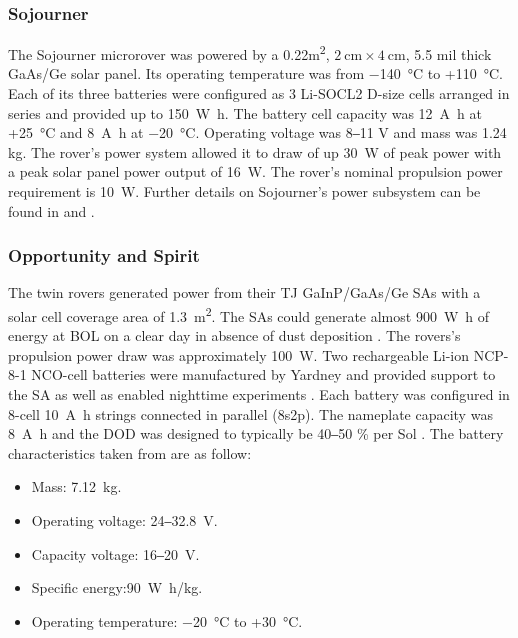 \subsubsection{Sojourner}
The Sojourner microrover was powered by a 0.22\si{\meter\squared}, $\SI{2}{\centi\meter}\times\SI{4}{\centi\meter}$, 5.5 mil thick \ac{GaAs}/\ac{Ge} solar panel. Its operating temperature was from \SI{-140}{\celsius} to +\SI{110}{\celsius}. Each of its three batteries were configured as 3 \ac{Li-SOCL2} D-size cells arranged in series and provided up to \SI{150}{\watt\hour}. The battery cell capacity was \SI{12}{\ampere\hour} at +\SI{25}{\celsius} and \SI{8}{\ampere\hour} at \SI{-20}{\celsius}. Operating voltage was 8‒11 \si{\volt} and mass was 1.24 \si{\kilo\gram}. The rover's power system allowed it to draw of up \SI{30}{\watt} of peak power with a peak solar panel power output of \SI{16}{\watt}. The rover's nominal propulsion power requirement is \SI{10}{\watt}. Further details on Sojourner's power subsystem can be found in  and .

\subsubsection{Opportunity and Spirit}
The twin rovers generated power from their \ac{TJ} \ac{GaInP}/\ac{GaAs}/\ac{Ge} \acp{SA} with a solar cell coverage area of \SI{1.3}{\square\meter}. The \acp{SA} could generate almost \SI{900}{\watt\hour} of energy at \ac{BOL} on a clear day in absence of dust deposition . The rovers's propulsion power draw was approximately \SI{100}{\watt}. Two rechargeable \ac{Li-ion} NCP-8-1 \ac{NCO}-cell batteries were manufactured by Yardney and provided support to the \ac{SA} as well as enabled nighttime experiments . Each battery was configured in 8-cell \SI{10}{\ampere\hour} strings connected in parallel (8s2p). The nameplate capacity was \SI{8}{\ampere\hour} and the \ac{DOD} was designed to typically be 40‒50 \si{\percent} per Sol . The battery characteristics taken from  are as follow:

\begin{itemize}
	\item Mass: \SI{7.12}{\kilo\gram}.
	\item Operating voltage: 24‒\SI{32.8}{\volt}.
	\item Capacity voltage: 16‒\SI{20}{\volt}.
	\item Specific energy:\SI{90}{\watt\hour/\kilo\gram}.
    \item Operating temperature: \SI{-20}{\celsius} to +\SI{30}{\celsius}.
\end{itemize}

